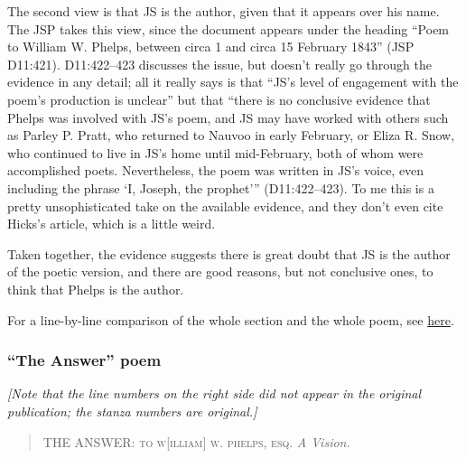 			The second view is that JS is the author, given that it appears over his name. The JSP takes this view, since the document appears under the heading ``Poem to William W. Phelps, between circa 1 and circa 15 February 1843'' (JSP D11:421). D11:422--423 discusses the issue, but doesn't really go through the evidence in any detail; all it really says is that ``JS's level of engagement with the poem's production is unclear'' but that ``there is no conclusive evidence that Phelps was involved with JS's poem, and JS may have worked with others such as Parley P. Pratt, who returned to Nauvoo in early February, or Eliza R. Snow, who continued to live in JS's home until mid-February, both of whom were accomplished poets. Nevertheless, the poem was written in JS's voice, even including the phrase `I, Joseph, the prophet''' (D11:422--423). To me this is a pretty unsophisticated take on the available evidence, and they don't even cite Hicks's article, which is a little weird.
				
			Taken together, the evidence suggests there is great doubt that JS is the author of the poetic version, and there are good reasons, but not conclusive ones, to think that Phelps is the author.
				
			For a line-by-line comparison of the whole section and the whole poem, see \href{https://drive.google.com/file/d/1cEiNPrMd8nMJ7jXu4MBYsg0jXjpnQ-Df/view?usp=sharing}{here}.
		
		\subsubsection{``The Answer'' poem}
		
			\textit{[Note that the line numbers on the right side did not appear in the original publication; the stanza numbers are original.]}
		
			\begin{quote}
				THE ANSWER: \textsc{to w}[\textsc{illiam}] \textsc{w. phelps, esq.} \textit{A Vision.}
			\end{quote}
		
